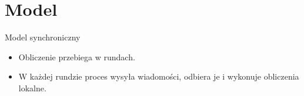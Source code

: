 \section{Model}

\begin{frame}{Model synchroniczny}
  \begin{itemize}
    \item Obliczenie przebiega w rundach.
    \item W każdej rundzie proces wysyła wiadomości, odbiera je i wykonuje obliczenia lokalne.
  \end{itemize}
\end{frame}
